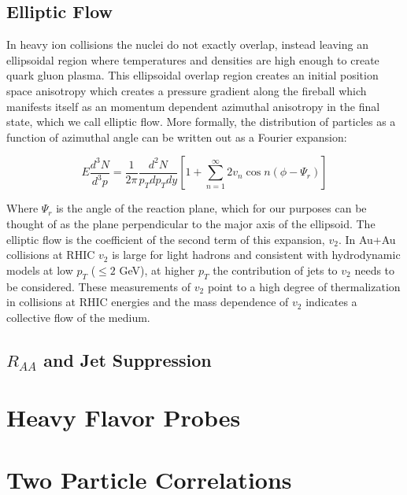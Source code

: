\subsection{Elliptic Flow}

In heavy ion collisions the nuclei do not exactly overlap, instead leaving an ellipsoidal region where temperatures and densities are high enough to create quark gluon plasma. This ellipsoidal overlap region creates an initial position space anisotropy which creates a pressure gradient along the fireball which manifests itself as an momentum dependent azimuthal anisotropy in the final state, which we call elliptic flow. More formally, the distribution of particles as a function of azimuthal angle can be written out as a Fourier expansion:

\begin{equation}\label{eq:v2def}
E\frac{d^3N}{d^3p} = \frac{1}{2\pi}\frac{d^2N}{p_Tdp_Tdy}[1 + \sum_{n=1}^{\infty}2 v_n \cos{n(\phi - \Psi_r)}]
\end{equation}

Where $\Psi_r$ is the angle of the reaction plane, which for our purposes can be thought of as the plane perpendicular to the major axis of the ellipsoid. The elliptic flow is the coefficient of the second term of this expansion, $v_2$. In Au+Au collisions at RHIC $v_2$ is large for light hadrons and consistent with hydrodynamic models at low $p_T$ ($\leq 2$ GeV), at higher $p_T$ the contribution of jets to $v_2$ needs to be considered. These measurements of $v_2$ point to a high degree of thermalization in collisions at RHIC energies and the mass dependence of $v_2$ indicates a collective flow of the medium.


\subsection{$R_{AA}$ and Jet Suppression}

\section{Heavy Flavor Probes}

\section{Two Particle Correlations}
